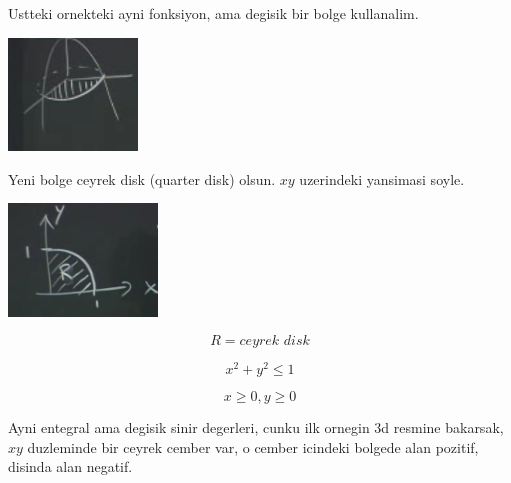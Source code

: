 \documentclass[12pt,fleqn]{article}
\begin{document}
Ustteki ornekteki ayni fonksiyon, ama degisik bir bolge kullanalim. 

\includegraphics[height=3cm]{16_9.png}

Yeni bolge ceyrek disk (quarter disk) olsun. $xy$ uzerindeki yansimasi
soyle. 

\includegraphics[height=3cm]{16_10.png}

\[ R = \textit{ceyrek disk}  \]

\[ x^2 + y^2 \le 1 \]

\[ x \ge 0, y \ge 0 \]

Ayni entegral ama degisik sinir degerleri, cunku ilk ornegin 3d resmine
bakarsak, $xy$ duzleminde bir ceyrek cember var, o cember icindeki bolgede
alan pozitif, disinda alan negatif. 
\end{document}
